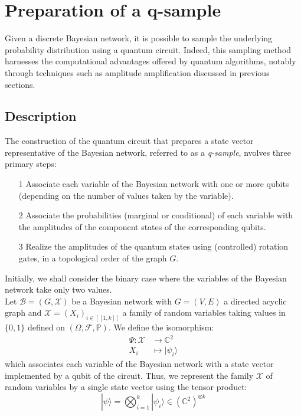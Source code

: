 \section{Preparation of a q-sample}
\label{part4}

Given a discrete Bayesian network, it is possible to sample the underlying probability distribution using a quantum circuit. Indeed, this sampling method harnesses the computational advantages offered by quantum algorithms, notably through techniques such as amplitude amplification discussed in previous sections. \cite{borujeni2021quantum}

\subsection{Description}
The construction of the quantum circuit that prepares a state vector representative of the Bayesian network, referred to as a \textit{q-sample}, nvolves three primary steps:
\begin{itemize}
\item[1] Associate each variable of the Bayesian network with one or more qubits (depending on the number of values taken by the variable).
\item[2] Associate the probabilities (marginal or conditional) of each variable with the amplitudes of the component states of the corresponding qubits.
\item[3] Realize the amplitudes of the quantum states using (controlled) rotation gates, in a topological order of the graph $G$.
\end{itemize}
Initially, we shall consider the binary case where the variables of the Bayesian network take only two values.
\\[5pt]
Let $\mathcal{B} = (G,\mathcal{X})$ be a Bayesian network with $G=(V,E)$ a directed acyclic graph and $\mathcal{X}=(X_i)_{i\in[\![1,k]\!]}$ a family of random variables taking values in $\{0,1\}$ defined on $(\Omega, \mathcal{F}, \mathbb{P})$. We define the isomorphism:
\begin{align*}
    \Psi : \mathcal{X} &\longrightarrow \mathbb{C}^2\\
    X_i &\longmapsto |\psi_i\rangle
\end{align*}
which associates each variable of the Bayesian network with a state vector implemented by a qubit of the circuit. Thus, we represent the family $\mathcal{X}$ of random variables by a single state vector using the tensor product:
\[|\psi\rangle = \bigotimes_{i=1}^{k}|\psi_i\rangle \in (\mathbb{C}^2)^{\otimes k}\]
